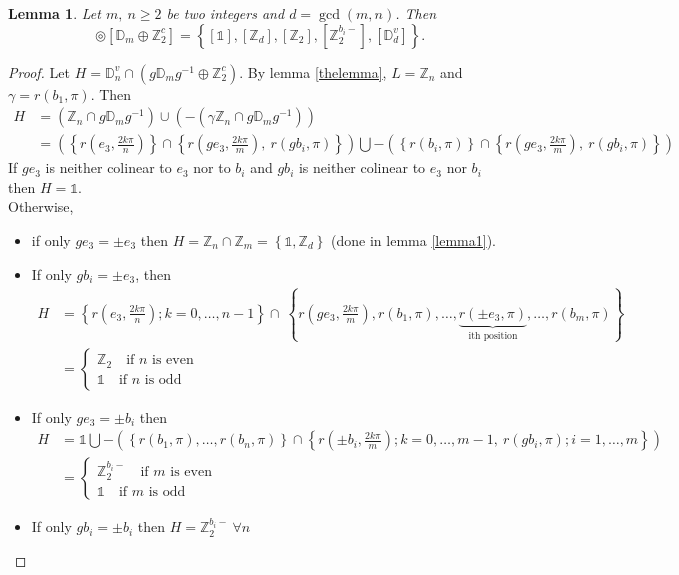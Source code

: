 \documentclass[11pt,a4paper]{amsart}
\newtheorem{lem}[thm]{Lemma}
\theoremstyle{definition}
\newcommand{\ZZ}{\mathbb{Z}}                %
\newcommand{\DD}{\mathbb{D}}                %
\newcommand{\1}{\mathds{1}}		            %
\newcommand{\set}[1]{\left\{#1\right\}}     %
\begin{document}
\begin{lem}
Let $m,\ n \geq 2$ be two integers and $d=\gcd(m,n)$. Then
\begin{equation*}
[\DD_{n}^{v}] \circledcirc [\DD_m \oplus \ZZ_2^c]=\set{[\1],[\ZZ_d],[\ZZ_2],[\ZZ_2^{b_i-}],[\DD_d^v]}.
\end{equation*}
\end{lem}
\begin{proof}
Let $H=\DD_{n}^v \cap (g\DD_m g^{-1} \oplus \ZZ_2^c)$.
By lemma \ref{thelemma}, $L=\ZZ_n$ and $\gamma=r(b_1,\pi)$. Then
\begin{align*}
H&=(\ZZ_n\cap g \DD_m g^{-1})\cup (-(\gamma\ZZ_n\cap g \DD_m g^{-1}))\\
 &=\left(\set{r(e_3,\frac{2k\pi}{n})}\cap \set{r(ge_3,\frac{2k\pi}{m}),\ r(gb_i,\pi)}\right)\bigcup-\left(\set{r(b_i,\pi)}\cap \set{r(ge_3,\frac{2k\pi}{m}),\ r(gb_i,\pi)}\right)
\end{align*}
If $ge_3$ is neither colinear to $e_3$ nor to $b_i$ and $gb_i$ is neither colinear to $e_3$ nor $b_i$ then $H=\1$.\\
Otherwise,
\begin{itemize}
\item if only $ge_3=\pm e_3$ then $H=\ZZ_n\cap\ZZ_m=\set{\1,\ZZ_d}$ (done in lemma \ref{lemma1}).
\item If only $gb_i=\pm e_3$, then
\begin{align*}
H&=\set{r(e_3,\frac{2k\pi}{n});k=0,\dotsc, n-1}\cap \ \set{r(ge_3,\frac{2k\pi}{m}),r(b_1,\pi),\dotsc,\underbrace{r(\pm e_3,\pi)}_{\text{ith position}},\dotsc, r(b_m,\pi)}\\
&=
\begin{cases}
\ZZ_2 \quad \text{if $n$ is even}\\
\1 \quad \text{if $n$ is odd}
\end{cases}
\end{align*}
\item If only $ge_3=\pm b_i$ then
\begin{align*}
H&=\1\bigcup -\left(\set{r(b_1,\pi),\dotsc,r(b_n,\pi)}\cap \set{r(\pm b_i,\frac{2k\pi}{m});k=0,\dotsc, m-1,\ r(gb_i,\pi); i=1,\dotsc,m}\right)\\
&=
\begin{cases}
\ZZ_2^{b_i-} \quad \text{if $m$ is even}\\
\1 \quad \text{if $m$ is odd}
\end{cases}
\end{align*}
\item If only $gb_i=\pm b_i$ then $H=\ZZ_2^{b_i-} \ \forall n$

\end{itemize}
\end{proof}
\end{document}
